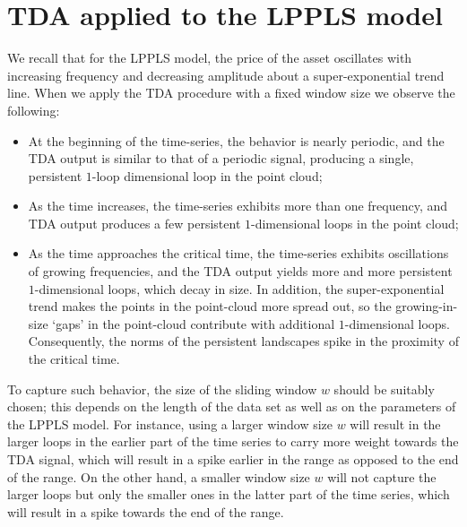 \documentclass[11pt]{amsart}
\theoremstyle{definition}
\theoremstyle{remark}
\numberwithin{equation}{section}
\begin{document}
\section{TDA applied to the LPPLS model}
We recall that for the LPPLS model, the price of the asset oscillates with increasing frequency and decreasing amplitude about a super-exponential trend line.
When we apply the TDA procedure with a fixed window size we  observe the following:
\begin{itemize}
\item At the beginning of the time-series, the behavior is nearly periodic, and the TDA output is similar to that of  a periodic signal, producing a single,
    persistent  $1$-loop dimensional loop in the point cloud;
\item  As the time increases, the time-series exhibits more than one frequency,  and  TDA output produces
     a few  persistent $1$-dimensional loops in the point cloud;
\item  As the time approaches the critical time, the time-series exhibits oscillations of growing frequencies, and the  TDA output yields more and more  persistent  $1$-dimensional loops, which decay in size. In addition, the super-exponential trend
makes the points in the point-cloud more spread out, so the growing-in-size  `gaps' in the point-cloud contribute with additional   $1$-dimensional loops.
Consequently, the norms of the persistent landscapes spike in the proximity of the critical time.
\end{itemize}


To capture such behavior, the size of the sliding window $w$ should be suitably chosen; this depends on the length of the data set as well as on the parameters of the LPPLS model. For instance, using a larger  window size $w$ will result in   the larger loops in the earlier part of the time series to carry more weight towards the TDA signal, which will result in a spike earlier in the range as opposed to the end of the range. On the other hand,  a smaller window size $w$ will not capture the larger loops but only the smaller ones in the latter part of the time series,  which will result in a spike towards the end of the range.

\end{document}
